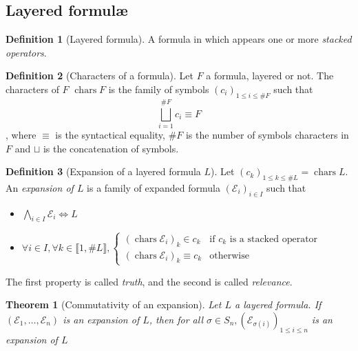 \documentclass{article}
\DeclareMathOperator{\chars}{chars}
\newtheorem{theorem}{Theorem}
\theoremstyle{definition}
\newtheorem{definition}{Definition}
\begin{document}
\subsection{Layered formul\ae}

\begin{definition}[Layered formula]
	A formula in which appears one or more \emph{stacked operators}.
\end{definition}

\begin{definition}[Characters of a formula]
	Let $F$ a formula, layered or not.
	The characters of $F$  $\chars{F}$ is the family of symbols  $(c_i)_{1\le i\le \#F}$ such that
	\[
		\bigsqcup_{i=1}^{\#F} c_i \equiv F
	\], where $\equiv$ is the syntactical equality, $\#F$ is the number of symbols characters in $F$ and $\sqcup$ is the concatenation of symbols.
\end{definition}

\begin{definition}[Expansion of a layered formula $L$]
	Let $(c_k)_{1\le k\le \#L} = \chars L$.
	An  \emph{expansion of $L$} is a family of expanded formula $\left( \mathcal E_i \right)_{i\in I} $ such that

	\begin{itemize}
		\item $\bigwedge_{i\in I} \mathcal{E}_i \iff L$ 
		\item $\forall i\in I, \forall k\in \llbracket 1, \#L\rrbracket, \begin{cases}
				(\chars \mathcal{E}_i)_k \in c_k &\text{if $c_k$ is a stacked operator} \\
				(\chars \mathcal{E}_i)_k \equiv c_k &\text{otherwise}
			\end{cases}$ 
	\end{itemize}

	The first property is called  \emph{truth}, and the second is called \emph{relevance}.

	
\end{definition}

\begin{theorem}[Commutativity of an expansion]
	Let $L$ a layered formula.
	If $(\mathcal{E}_1, \ldots, \mathcal{E}_n)$ is an expansion of $L$, then for all $\sigma\in S_n, (\mathcal{E}_{\sigma(i)})_{1\le i\le n}$ is an expansion of $L$
\end{theorem}
\end{document}
